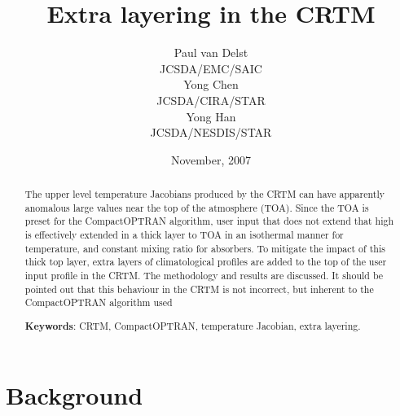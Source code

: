 

\title{Extra layering in the CRTM}
\author{Paul van Delst\\JCSDA/EMC/SAIC\\[0.25in]
        Yong Chen\\JCSDA/CIRA/STAR\\[0.25in]
        Yong Han\\JCSDA/NESDIS/STAR}
\date{November, 2007}



\maketitle

\begin{abstract}
The upper level temperature Jacobians produced by the CRTM can have apparently anomalous large values near the top of the atmosphere (TOA). Since the TOA is preset for the CompactOPTRAN algorithm, user input that does not extend that high is effectively extended in a thick layer to TOA in an isothermal manner for temperature, and constant mixing ratio for absorbers. To mitigate the impact of this thick top layer, extra layers of climatological profiles are added to the top of the user input profile in the CRTM. The methodology and results are discussed. It should be pointed out that this behaviour in the CRTM is not incorrect, but inherent to the CompactOPTRAN algorithm used 

\textbf{Keywords}: CRTM, CompactOPTRAN, temperature Jacobian, extra layering.
\end{abstract}



\section{Background}
\label{sec:background}
